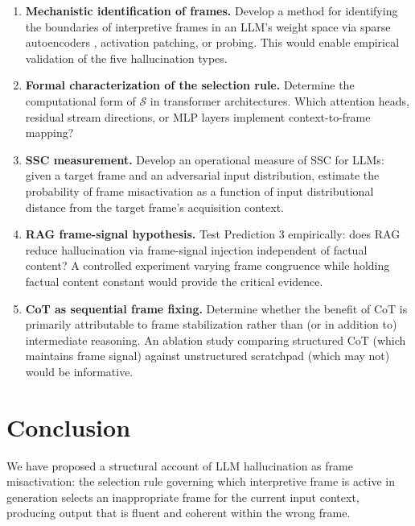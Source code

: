 \documentclass[12pt]{article}
\begin{document}
\begin{enumerate}[label=\textbf{OP\arabic*.}, leftmargin=*, itemsep=4pt]

\item \textbf{Mechanistic identification of frames.}
    Develop a method for identifying the boundaries of
    interpretive frames in an LLM's weight space via sparse
    autoencoders \cite{bricken2023monosemanticity}, activation
    patching, or probing. This would enable empirical validation
    of the five hallucination types.

\item \textbf{Formal characterization of the selection rule.}
    Determine the computational form of $\mathcal{S}$ in
    transformer architectures. Which attention heads, residual
    stream directions, or MLP layers implement context-to-frame
    mapping?

\item \textbf{SSC measurement.}
    Develop an operational measure of SSC for LLMs: given a
    target frame and an adversarial input distribution, estimate
    the probability of frame misactivation as a function of
    input distributional distance from the target frame's
    acquisition context.

\item \textbf{RAG frame-signal hypothesis.}
    Test Prediction 3 empirically: does RAG reduce hallucination
    via frame-signal injection independent of factual content?
    A controlled experiment varying frame congruence while
    holding factual content constant would provide the critical
    evidence.

\item \textbf{CoT as sequential frame fixing.}
    Determine whether the benefit of CoT is primarily
    attributable to frame stabilization rather than (or in
    addition to) intermediate reasoning. An ablation study
    comparing structured CoT (which maintains frame signal)
    against unstructured scratchpad (which may not) would
    be informative.

\end{enumerate}

\section{Conclusion}

We have proposed a structural account of LLM hallucination as
frame misactivation: the selection rule governing which
interpretive frame is active in generation selects an
inappropriate frame for the current input context, producing
output that is fluent and coherent within the wrong frame.
\end{document}
